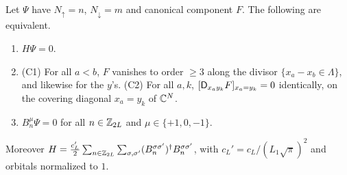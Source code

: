 \begin{lemma}\label{kz:lem:A}
Let $\Psi$ have $N_\uparrow=n$, $N_\downarrow=m$ and canonical component $F$. The following are equivalent.
\begin{enumerate}
\item[(1)] $H\Psi=0$.
\item[(2)] \textup{(C1)} For all $a<b$, $F$ vanishes to order $\ge3$ along the divisor
$\{x_a-x_b\in\Lambda\}$, and likewise for the $y$'s. \textup{(C2)} For all $a,k$,
$[\mathsf{D}_{x_ay_k}F]_{x_a=y_k}=0$ identically, on the covering diagonal $x_a=y_k$ of $\mathbb{C}^N$.
\item[(3)] $B_n^\mu\Psi=0$ for all $n\in\mathbb{Z}_{2L}$ and $\mu\in\{+1,0,-1\}$.
\end{enumerate}
Moreover $H=\tfrac{c_L'}{2}\sum_{n\in\mathbb{Z}_{2L}}\sum_{\sigma,\sigma'}(B_n^{\sigma\sigma'})^\dagger B_n^{\sigma\sigma'}$, with $c_L'=c_L/(L_1\sqrt\pi)^2$
and orbitals normalized to $1$.
\end{lemma}

